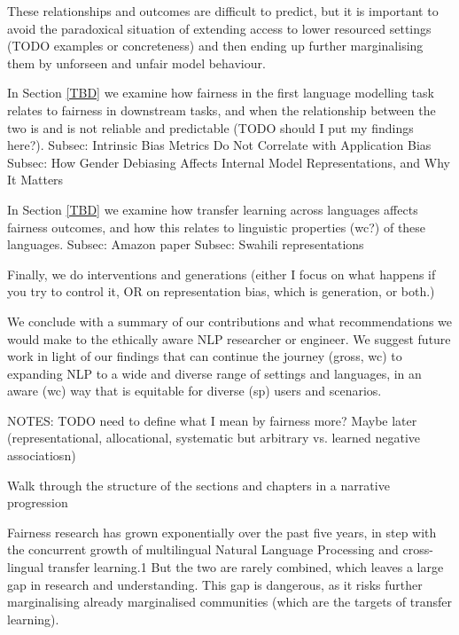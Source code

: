 These relationships and outcomes are difficult to predict, but it is important to avoid the paradoxical situation of extending access to lower resourced settings (TODO examples or concreteness) and then ending up further marginalising them by unforseen and unfair model behaviour. 

In Section \ref{TBD} we examine how fairness in the first language modelling task relates to fairness in downstream tasks, and when the relationship between the two is and is not reliable and predictable (TODO should I put my findings here?).
Subsec: Intrinsic Bias Metrics Do Not Correlate with Application Bias
Subsec: How Gender Debiasing Affects Internal Model Representations, and Why It Matters

In Section \ref{TBD} we examine how transfer learning across languages affects fairness outcomes, and how this relates to linguistic properties (wc?) of these languages.
Subsec: Amazon paper
Subsec: Swahili representations

Finally, we do interventions and generations (either I focus on what happens if you try to control it, OR on representation bias, which is generation, or both.)

We conclude with a summary of our contributions and what recommendations we would make to the ethically aware NLP researcher or engineer. We suggest future work in light of our findings that can continue the journey (gross, wc) to expanding NLP to a wide and diverse range of settings and languages, in an aware (wc) way that is equitable for diverse (sp) users and scenarios. 

NOTES:
TODO need to define what I mean by fairness more? Maybe later (representational, allocational, systematic but arbitrary vs. learned negative associatiosn)

Walk through the structure of the sections and chapters in a narrative progression





Fairness research has grown exponentially over the
past five years, in step with the concurrent growth
of multilingual Natural Language Processing
and cross-lingual transfer learning.1 But the
two are rarely combined, which leaves a large
gap in research and understanding. This gap is
dangerous, as it risks further marginalising already
marginalised communities (which are the targets of
transfer learning). 